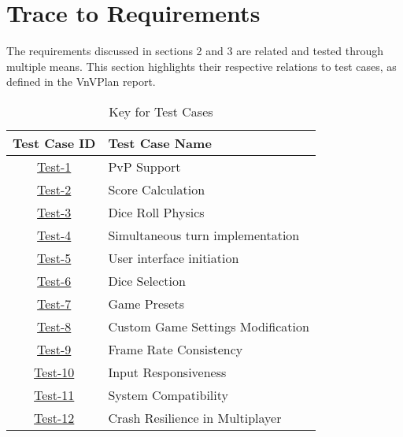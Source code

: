 \documentclass[12pt, titlepage]{article}
\begin{document}
\newpage
\section{Trace to Requirements}

The requirements discussed in sections 2 and 3 are related and tested through multiple means. This section highlights their respective relations to test cases, as defined in the VnVPlan report.

\begin{table}[H]
    \centering
    
    \begin{tabular}{|c|l|}
        \hline
        \textbf{Test Case ID} & \textbf{Test Case Name} \\
        \hline
        \hyperref[test-1]{Test-1} & PvP Support \\
        \hyperref[test-2]{Test-2} & Score Calculation \\
        \hyperref[test-3]{Test-3} & Dice Roll Physics \\
        \hyperref[test-4]{Test-4} & Simultaneous turn implementation \\
        \hyperref[test-5]{Test-5} & User interface initiation \\
        \hyperref[test-6]{Test-6} & Dice Selection \\
        \hyperref[test-7]{Test-7} & Game Presets \\
        \hyperref[test-8]{Test-8} & Custom Game Settings Modification \\
        \hyperref[test-9]{Test-9} & Frame Rate Consistency \\
        \hyperref[test-10]{Test-10} & Input Responsiveness \\
        \hyperref[test-11]{Test-11} & System Compatibility \\
        \hyperref[test-12]{Test-12} & Crash Resilience in Multiplayer \\
        \hline
    \end{tabular}
    \label{tab:traceability_key1}
    \caption{Key for Test Cases}
\end{table}
\end{document}
